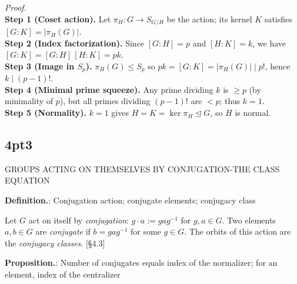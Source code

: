 \documentclass[12pt]{article}
\theoremstyle{definition}
\begin{document}
\emph{Proof.}\\
\textbf{Step 1 (Coset action).} Let $\pi_H:G\to S_{G/H}$ be the action; its kernel $K$ satisfies $[G:K]=|\pi_H(G)|$.\\
\textbf{Step 2 (Index factorization).} Since $[G:H]=p$ and $[H:K]=k$, we have $[G:K]=[G:H]\,[H:K]=pk$.\\
\textbf{Step 3 (Image in $S_p$).} $\pi_H(G)\le S_p$ so $pk=[G:K]=|\pi_H(G)|\mid p!$, hence $k\mid(p-1)!$.\\
\textbf{Step 4 (Minimal prime squeeze).} Any prime dividing $k$ is $\ge p$ (by minimality of $p$), but all primes dividing $(p-1)!$ are $<p$; thus $k=1$.\\
\textbf{Step 5 (Normality).} $k=1$ gives $H=K=\ker\pi_H\trianglelefteq G$, so $H$ is normal.\\

\newpage

\subsection*{4pt3}

\newpage

GROUPS ACTING ON THEMSELVES BY CONJUGATION-THE CLASS EQUATION 

\newpage


\noindent\textbf{Definition.}: Conjugation action; conjugate elements; conjugacy class

\newpage

Let $G$ act on itself by \emph{conjugation}: $g\cdot a:=gag^{-1}$ for $g,a\in G$. Two elements $a,b\in G$ are \emph{conjugate} if $b=gag^{-1}$ for some $g\in G$. The orbits of this action are the \emph{conjugacy classes}. \hfill {\footnotesize [§4.3]}\\


\newpage


\noindent\textbf{Proposition.}: Number of conjugates equals index of the normalizer; for an element, index of the centralizer
\end{document}
